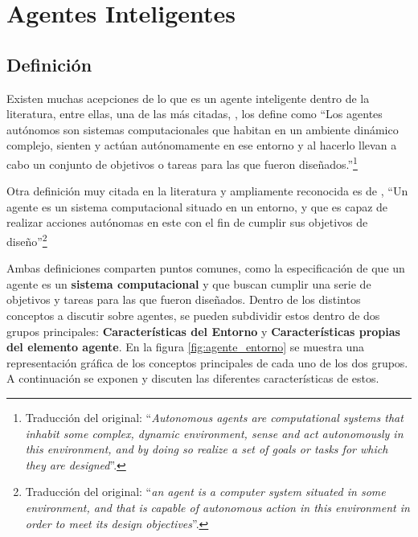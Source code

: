 \section{Agentes Inteligentes}\label{sec:agents}

\subsection{Definición}
Existen muchas acepciones de lo que es un agente inteligente dentro de la literatura, entre ellas, una de las más citadas, \textcite[p.~139]{maes1993modeling}, los define como \enquote{Los agentes autónomos son sistemas computacionales que habitan en un ambiente dinámico complejo, sienten y actúan autónomamente en ese entorno y al hacerlo llevan a cabo un conjunto de objetivos o tareas para las que fueron diseñados.}\footnote{Traducción del original: \enquote{\textit{Autonomous agents are computational systems that inhabit some complex,
dynamic environment, sense and act autonomously in this environment, and by doing so realize a set of goals or tasks for which they are designed}}.}

Otra definición muy citada en la literatura y ampliamente reconocida es de \textcite[p.~4]{jennings1998applications}, \enquote{Un agente es un sistema computacional situado en un entorno, y que es capaz de realizar acciones autónomas en este con el fin de cumplir sus objetivos de diseño}\footnote{Traducción del original: \enquote{\textit{an agent is a computer system situated in some environment, and that is capable of autonomous action in this environment in order to meet its design objectives}}.}

Ambas definiciones comparten puntos comunes, como la especificación de que un agente es un \textbf{sistema computacional} y que buscan cumplir una serie de objetivos y tareas para las que fueron diseñados\cite{maes1993modeling,jennings1998applications}. Dentro de los distintos conceptos a discutir sobre agentes, se pueden subdividir estos dentro de dos grupos principales: \textbf{Características del Entorno} y \textbf{Características propias del elemento agente}. En la figura \ref{fig:agente_entorno} se muestra una representación gráfica de los conceptos principales de cada uno de los dos grupos. A continuación se exponen y discuten las diferentes características de estos.

